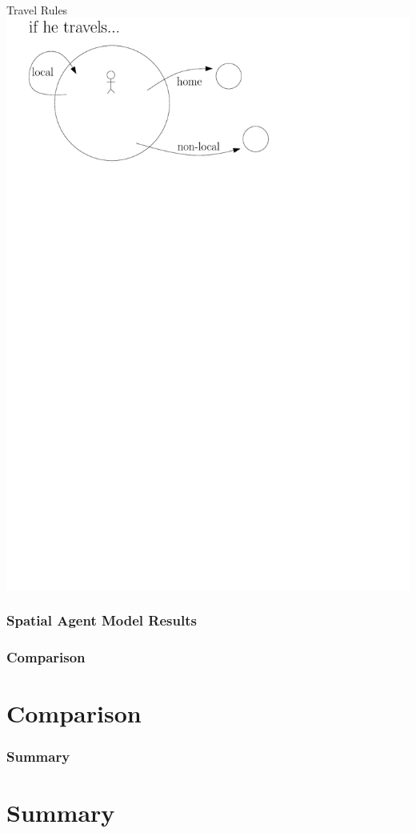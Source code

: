 \documentclass[30pt]{beamer}
\begin{document}
\begin{frame}{Travel Rules}
\includegraphics[width=\textwidth]{travel}
\end{frame}


\begin{frame}
\frametitle{Spatial Agent Model Results}

\end{frame}

\begin{frame}
\frametitle{Comparison}
\section{Comparison}
\end{frame}

\begin{frame}
\frametitle{Summary}
\section{Summary}
\end{frame}
\end{document}
